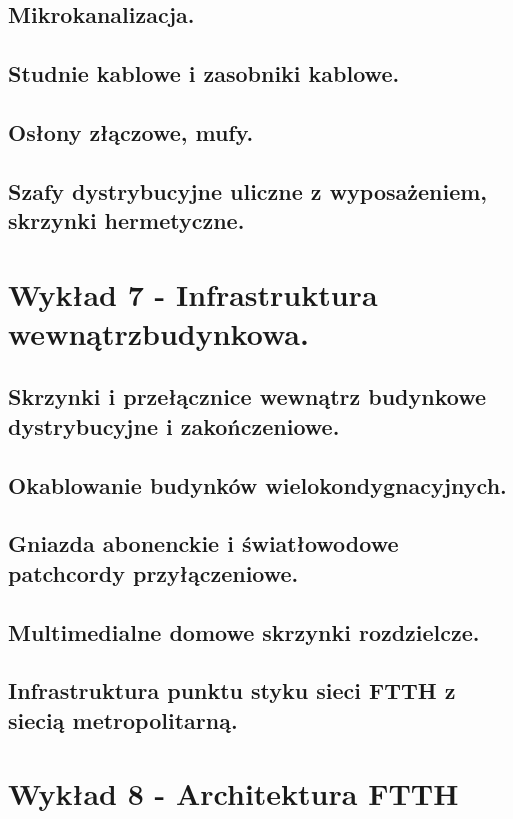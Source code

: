 \documentclass{article}
\begin{document}
\subsection{Mikrokanalizacja.}
\subsection{Studnie kablowe i zasobniki kablowe.}
\subsection{Osłony złączowe, mufy.}
\subsection{Szafy dystrybucyjne uliczne z wyposażeniem, skrzynki hermetyczne.}














\section{Wykład 7 - Infrastruktura wewnątrzbudynkowa.}
\subsection{Skrzynki i przełącznice wewnątrz budynkowe dystrybucyjne i zakończeniowe.}
\subsection{Okablowanie budynków wielokondygnacyjnych.}
\subsection{Gniazda abonenckie i światłowodowe patchcordy przyłączeniowe.}
\subsection{Multimedialne domowe skrzynki rozdzielcze.}
\subsection{Infrastruktura punktu styku sieci FTTH z siecią metropolitarną.}
\newpage
\section{Wykład 8 - Architektura FTTH}
\end{document}
